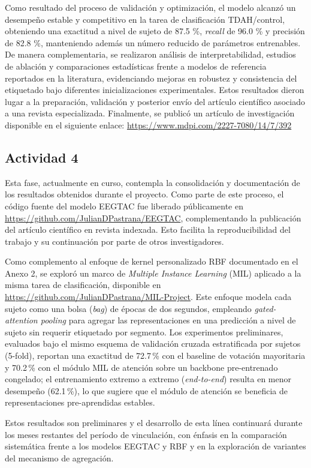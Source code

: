 Como resultado del proceso de validación y optimización, el modelo alcanzó un desempeño estable y competitivo en la tarea de clasificación TDAH/control, obteniendo una exactitud a nivel de sujeto de 87.5 \%, \textit{recall} de 96.0 \% y precisión de 82.8 \%, manteniendo además un número reducido de parámetros entrenables. De manera complementaria, se realizaron análisis de interpretabilidad, estudios de ablación y comparaciones estadísticas frente a modelos de referencia reportados en la literatura, evidenciando mejoras en robustez y consistencia del etiquetado bajo diferentes inicializaciones experimentales. Estos resultados dieron lugar a la preparación, validación y posterior envío del artículo científico asociado a una revista especializada. Finalmente, se publicó un artículo de investigación disponible en el siguiente enlace: \url{https://www.mdpi.com/2227-7080/14/7/392}

\subsection{Actividad 4}

Esta fase, actualmente en curso, contempla la consolidación y documentación de los resultados obtenidos durante el proyecto. Como parte de este proceso, el código fuente del modelo EEGTAC fue liberado públicamente en \url{https://github.com/JulianDPastrana/EEGTAC}, complementando la publicación del artículo científico en revista indexada. Esto facilita la reproducibilidad del trabajo y su continuación por parte de otros investigadores.

Como complemento al enfoque de kernel personalizado RBF documentado en el Anexo 2, se exploró un marco de \textit{Multiple Instance Learning} (MIL) aplicado a la misma tarea de clasificación, disponible en \url{https://github.com/JulianDPastrana/MIL-Project}. Este enfoque modela cada sujeto como una bolsa (\textit{bag}) de épocas de dos segundos, empleando \textit{gated-attention pooling} para agregar las representaciones en una predicción a nivel de sujeto sin requerir etiquetado por segmento. Los experimentos preliminares, evaluados bajo el mismo esquema de validación cruzada estratificada por sujetos (5-fold), reportan una exactitud de 72.7\,\% con el baseline de votación mayoritaria y 70.2\,\% con el módulo MIL de atención sobre un backbone pre-entrenado congelado; el entrenamiento extremo a extremo (\textit{end-to-end}) resulta en menor desempeño (62.1\,\%), lo que sugiere que el módulo de atención se beneficia de representaciones pre-aprendidas estables.

Estos resultados son preliminares y el desarrollo de esta línea continuará durante los meses restantes del período de vinculación, con énfasis en la comparación sistemática frente a los modelos EEGTAC y RBF y en la exploración de variantes del mecanismo de agregación.

